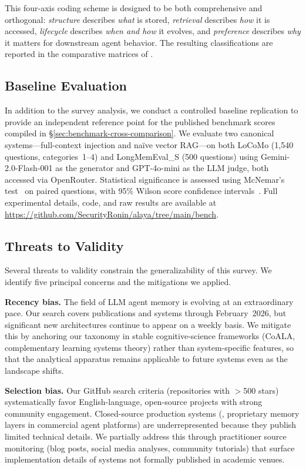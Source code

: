 This four-axis coding scheme is designed to be both comprehensive and
orthogonal: \emph{structure} describes \emph{what} is stored,
\emph{retrieval} describes \emph{how} it is accessed, \emph{lifecycle}
describes \emph{when and how} it evolves, and \emph{preference} describes
\emph{why} it matters for downstream agent behavior. The resulting
classifications are reported in the comparative matrices of
.

\subsection{Baseline Evaluation}
\label{sec:methodology-baseline}

In addition to the survey analysis, we conduct a controlled baseline
replication to provide an independent reference point for the published
benchmark scores compiled in \S\ref{sec:benchmark-cross-comparison}.  We
evaluate two canonical systems---full-context injection and na\"ive vector
RAG---on both LoCoMo (1{,}540 questions, categories~1--4) and LongMemEval\_S
(500 questions) using Gemini-2.0-Flash-001 as the generator and GPT-4o-mini as
the LLM judge, both accessed via OpenRouter.  Statistical significance is
assessed using McNemar's test~\cite{mcnemar1947} on paired questions, with
95\% Wilson score confidence intervals~\cite{wilson1927}.  Full experimental details, code, and raw results are
available at \url{https://github.com/SecurityRonin/alaya/tree/main/bench}.

\subsection{Threats to Validity}
\label{sec:threats}

Several threats to validity constrain the generalizability of this survey.
We identify five principal concerns and the mitigations we applied.

\textbf{Recency bias.} The field of LLM agent memory is evolving at an
extraordinary pace. Our search covers publications and systems through
February~2026, but significant new architectures continue to appear on a
weekly basis. We mitigate this by anchoring our taxonomy in stable
cognitive-science frameworks (CoALA, complementary learning systems
theory) rather than system-specific features, so that the analytical
apparatus remains applicable to future systems even as the landscape
shifts.

\textbf{Selection bias.} Our GitHub search criteria (repositories with
$>$500 stars) systematically favor English-language, open-source projects
with strong community engagement. Closed-source production systems
(\eg, proprietary memory layers in commercial agent platforms) are
underrepresented because they publish limited technical details. We
partially address this through practitioner source monitoring (blog posts,
social media analyses, community tutorials) that surface implementation
details of systems not formally published in academic venues.

